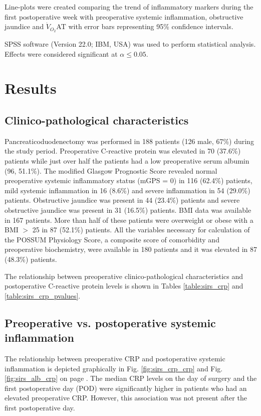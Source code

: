 Line-plots were created comparing the trend of inflammatory markers during the first postoperative week with preoperative systemic inflammation, obstructive jaundice and $\dot{V}_{O_2}$AT with error bars representing 95\% confidence intervals. 

SPSS software (Version 22.0; IBM, USA) was used to perform statistical analysis. 
Effects were considered significant at $\alpha \leq0.05$. 

\clearpage

\section{Results}

\subsection{Clinico-pathological characteristics}

Pancreaticoduodenectomy was performed in 188 patients (126 male, 67\%) during the study period.
Preoperative C-reactive protein was elevated in 70 (37.6\%) patients while just over half the patients had a low preoperative serum albumin (96, 51.1\%). 
The modified Glasgow Prognostic Score revealed normal preoperative systemic inflammatory status (mGPS = 0) in 116 (62.4\%) patients, mild systemic inflammation in 16 (8.6\%) and severe inflammation in 54 (29.0\%) patients. 
Obstructive jaundice was present in 44 (23.4\%) patients and severe obstructive jaundice was present in 31 (16.5\%) patients. 
BMI data was available in 167 patients. 
More than half of these patients were overweight or obese with a BMI $>$ 25 in 87 (52.1\%) patients.
All the variables necessary for calculation of the POSSUM Physiology Score, a composite score of comorbidity and preoperative biochemistry, were available in 180 patients and it was elevated in 87 (48.3\%) patients.

The relationship between preoperative clinico-pathological characteristics and postoperative C-reactive protein levels is shown in Tables \ref{table:sirs_crp} and \ref{table:sirs_crp_pvalues}.




\subsection{Preoperative vs. postoperative systemic inflammation}
The relationship between preoperative CRP and postoperative systemic inflammation is depicted graphically in Fig. \ref{fig:sirs_crp_crp} and Fig. \ref{fig:sirs_alb_crp} on page \pageref{fig:sirs_crp}.
The median CRP levels on the day of surgery and the first postoperative day (POD) were significantly higher in patients who had an elevated preoperative CRP. 
However, this association was not present after the first postoperative day.


